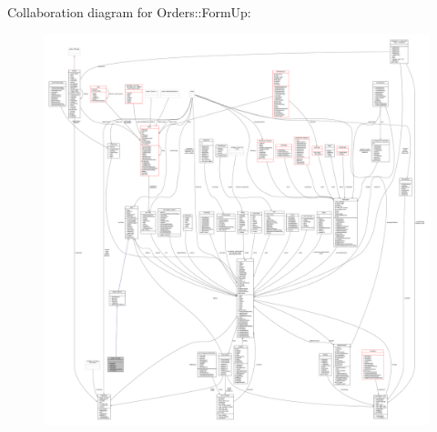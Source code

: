 Collaboration diagram for Orders\+:\+:Form\+Up\+:
\nopagebreak
\begin{figure}[H]
\begin{center}
\leavevmode
\includegraphics[width=350pt]{dc/d4b/classOrders_1_1FormUp__coll__graph}
\end{center}
\end{figure}
